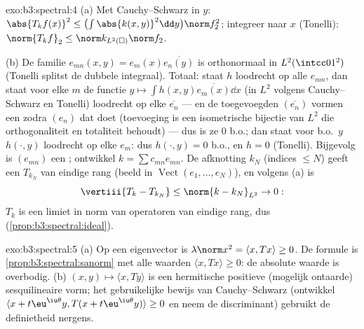 \begin{solution}{exo:b3:spectral:4}
(a) Met Cauchy--Schwarz in $y$: $\abs{T_kf(x)}^2 \leq
\bigl(\int\abs{k(x,y)}^2\dd y\bigr)\norm f_2^2$; integreer naar
$x$ (Tonelli): $\norm{T_kf}_2 \leq \norm k_{L^2(\square)} \norm
f_2$.

(b) De familie $e_{mn}(x,y) = e_m(x)\overline{e_n(y)}$ is
orthonormaal in $L^2(\intcc01^2)$ (Tonelli splitst de dubbele
integraal). Totaal: staat $h$ loodrecht op alle $e_{mn}$, dan
staat voor elke $m$ de functie $y \mapsto \int
h(x,y)\overline{e_m(x)}\dd x$ (in $L^2$ volgens Cauchy--Schwarz
en Tonelli) loodrecht op elke $\overline{e_n}$ --- en de
toegevoegden $(\overline{e_n})$ vormen een  zodra
$(e_n)$ dat doet (toevoeging is een isometrische bijectie van
$L^2$ die orthogonaliteit en totaliteit behoudt) --- dus is ze
$0$ b.o.; dan staat voor b.o.\ $y$ $h(\cdot, y)$ loodrecht op
elke $e_m$: dus $h(\cdot, y) = 0$ b.o., en $h = 0$ (Tonelli).
Bijgevolg is $(e_{mn})$ een ; ontwikkel $k = \sum
c_{mn}e_{mn}$. De afknotting $k_N$ (indices $\leq N$) geeft een
$T_{k_N}$ van eindige rang (beeld in $\operatorname{Vect}(e_1,
\dots, e_N)$), en volgens (a) is
\[
\vertiii{T_k - T_{k_N}} \leq \norm{k - k_N}_{L^2} \to 0 :
\]
$T_k$ is een limiet in norm van operatoren van eindige rang, dus
 (\cref{prop:b3:spectral:ideal}).
\end{solution}

\begin{solution}{exo:b3:spectral:5}
(a) Op een eigenvector is $\lambda\norm x^2 = \langle x,
Tx\rangle \geq 0$. De formule is
\cref{prop:b3:spectral:sanorm} met alle waarden $\langle x,
Tx\rangle \geq 0$: de absolute waarde is overbodig.
(b) $(x, y) \mapsto \langle x, Ty\rangle$ is een hermitische
positieve (mogelijk ontaarde) sesquilineaire vorm; het
gebruikelijke bewijs van Cauchy--Schwarz (ontwikkel $\langle x +
t\eu^{\iu\theta}y, T(x + t\eu^{\iu\theta}y)\rangle \geq 0$ en
neem de discriminant) gebruikt de definietheid nergens.
\end{solution}

